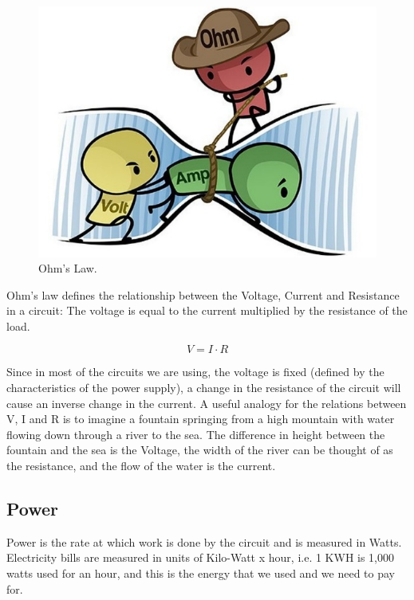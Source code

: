 \begin{figure}[!ht]
	\centering
	\includegraphics{images/ohms_law_cartoon.png}
	\caption{Ohm's Law.} \label{fig:ohms_law_cartoon}
\end{figure}

Ohm's law defines the relationship between the Voltage, Current and Resistance
in a circuit: The voltage is equal to the current multiplied by the resistance
of the load. 

\begin{displaymath}\label{eq:ohm}
    V=I \cdot R
\end{displaymath}

Since in most of the circuits we are using, the voltage is fixed (defined by the
characteristics of the power supply), a change in the resistance of the circuit
will cause an inverse change in the current. A useful
analogy for the relations between V, I and R is to imagine a fountain springing from a high
mountain with water flowing down through a river to the sea. The difference
in height between the fountain and the sea is the Voltage, the width of the
river can be thought of as the resistance, and the flow of the water is the
current.

\subsection{Power}

Power is the rate at which work is done by the circuit and is measured in Watts.
Electricity bills are measured in units of Kilo-Watt x hour, i.e. 1 KWH is 1,000 watts used
for an hour, and this is the energy that we used and we need to pay for. 

